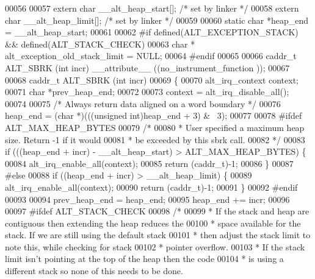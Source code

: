 \begin{DoxyCode}
00056 
00057 \textcolor{keyword}{extern} \textcolor{keywordtype}{char} __alt_heap_start[]; \textcolor{comment}{/* set by linker */}
00058 \textcolor{keyword}{extern} \textcolor{keywordtype}{char} __alt_heap_limit[]; \textcolor{comment}{/* set by linker */}
00059 
00060 \textcolor{keyword}{static} \textcolor{keywordtype}{char} *heap_end = __alt_heap_start;
00061 
00062 \textcolor{preprocessor}{#if defined(ALT\_EXCEPTION\_STACK) && defined(ALT\_STACK\_CHECK)}
00063 \textcolor{keywordtype}{char} * alt\_exception\_old\_stack\_limit = NULL;
00064 \textcolor{preprocessor}{#endif}
00065  
00066 caddr\_t ALT_SBRK (\textcolor{keywordtype}{int} incr) __attribute__ ((no\_instrument\_function ));
00067 
00068 caddr\_t ALT_SBRK (\textcolor{keywordtype}{int} incr)
00069 \{ 
00070   alt_irq_context context;
00071   \textcolor{keywordtype}{char} *prev\_heap\_end; 
00072 
00073   context = alt_irq_disable_all();
00074 
00075   \textcolor{comment}{/* Always return data aligned on a word boundary */}
00076   heap_end = (\textcolor{keywordtype}{char} *)(((\textcolor{keywordtype}{unsigned} \textcolor{keywordtype}{int})heap_end + 3) & ~3);
00077 
00078 \textcolor{preprocessor}{#ifdef ALT\_MAX\_HEAP\_BYTES}
00079   \textcolor{comment}{/*  }
00080 \textcolor{comment}{   * User specified a maximum heap size.  Return -1 if it would}
00081 \textcolor{comment}{   * be exceeded by this sbrk call.}
00082 \textcolor{comment}{   */}
00083   \textcolor{keywordflow}{if} (((heap_end + incr) - __alt_heap_start) > ALT\_MAX\_HEAP\_BYTES) \{
00084     alt_irq_enable_all(context);
00085     \textcolor{keywordflow}{return} (caddr\_t)-1;
00086   \}
00087 \textcolor{preprocessor}{#else}
00088   \textcolor{keywordflow}{if} ((heap_end + incr) > __alt_heap_limit) \{
00089     alt_irq_enable_all(context);
00090     \textcolor{keywordflow}{return} (caddr\_t)-1;
00091   \}
00092 \textcolor{preprocessor}{#endif}
00093 
00094   prev\_heap\_end = heap_end; 
00095   heap_end += incr; 
00096 
00097 \textcolor{preprocessor}{#ifdef ALT\_STACK\_CHECK}
00098   \textcolor{comment}{/*}
00099 \textcolor{comment}{   * If the stack and heap are contiguous then extending the heap reduces the}
00100 \textcolor{comment}{   * space available for the stack.  If we are still using the default stack}
00101 \textcolor{comment}{   * then adjust the stack limit to note this, while checking for stack}
00102 \textcolor{comment}{   * pointer overflow. }
00103 \textcolor{comment}{   * If the stack limit isn't pointing at the top of the heap then the code}
00104 \textcolor{comment}{   * is using a different stack so none of this needs to be done.}

\end{DoxyCode}
